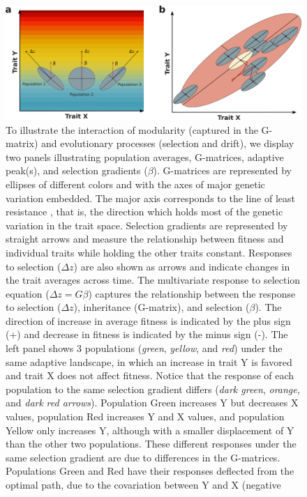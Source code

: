 \begin{refsection}
\begin{figure}
\includegraphics[width=\linewidth]{chapter_annual_review/media/figure2.png}
\caption[Evolution and covariation]{To illustrate the interaction of
modularity (captured in the G-matrix) and evolutionary processes
(selection and drift), we display two panels illustrating population
averages, G-matrices, adaptive peak(s), and selection gradients ($\beta$).
G-matrices are represented by ellipses of different colors and with the
axes of major genetic variation embedded. The major axis corresponds to
the line of least resistance \parencite{Schluter1996-gw}, 
that is, the direction which holds most of the genetic
variation in the trait space. Selection gradients are represented by
straight arrows and measure the relationship between fitness and
individual traits while holding the other traits constant. Responses to
selection ($\Delta z$) are also shown as arrows and indicate changes in the
trait averages across time. The multivariate response to selection
equation ($\Delta z = G\beta$) captures the relationship between the response to
selection ($\Delta z$), inheritance (G-matrix), and selection ($\beta$). The direction
of increase in average fitness is indicated by the plus sign (+) and
decrease in fitness is indicated by the minus sign (-). The left panel
shows 3 populations (\emph{green}, \emph{yellow}, and \emph{red}) under
the same adaptive landscape, in which an increase in trait Y is favored
and trait X does not affect fitness. Notice that the response of each
population to the same selection gradient differs (\emph{dark green},
\emph{orange,} and \emph{dark} \emph{red arrows}). Population Green
increases Y but decreases X values, population Red increases Y and X
values, and population Yellow only increases Y, although with a smaller
displacement of Y than the other two populations. These different
responses under the same selection gradient are due to differences in
the G-matrices. Populations Green and Red have their responses deflected
from the optimal path, due to the covariation between Y and X (negative
}
\end{figure}
\end{refsection}
